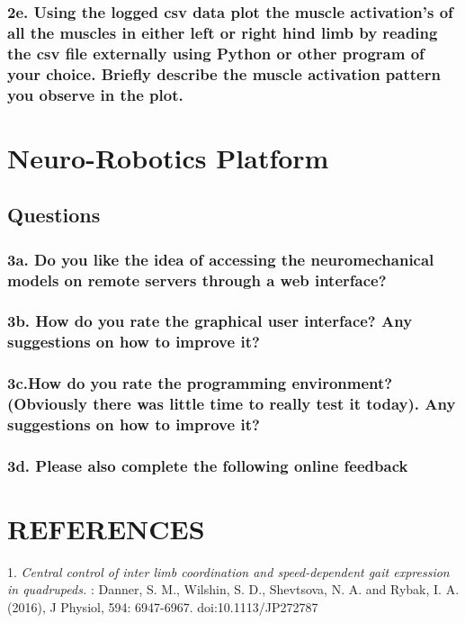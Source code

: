 \documentclass{cmc}
\begin{document}
{        \subsubsection*{2e. Using the logged csv data plot the muscle
          activation's of all the muscles in either left or right hind
          limb by reading the csv file externally using Python or
          other program of your choice. Briefly describe the muscle
          activation pattern you observe in the plot. }
      
        \section*{Neuro-Robotics Platform}
        \label{sec:nrp-feedb-quest}

        \subsection*{Questions}
        
        \subsubsection*{3a. Do you like the idea of accessing the
          neuromechanical models on remote servers through a web
          interface?}

        \subsubsection*{3b. How do you rate the graphical user
          interface? Any suggestions on how to improve it?}

        \subsubsection*{3c.How do you rate the programming
          environment?  (Obviously there was little time to really
          test it today). Any suggestions on how to improve it?}

        \subsubsection*{3d. Please also complete the following online
          feedback
          \href{https://docs.google.com/forms/d/e/1FAIpQLSfmcBCIoLaNXOuNBGXvWdIbC453-T6F-mEafyHQbhINUy8IMw/viewform}{
          }}

        \section*{REFERENCES}
        \label{sec:references}

        1. \textit{Central control of inter limb coordination and
          speed-dependent gait expression in quadrupeds.} : Danner,
        S. M., Wilshin, S. D., Shevtsova, N. A. and Rybak,
        I. A. (2016), J Physiol, 594: 6947-6967. doi:10.1113/JP272787
        \href{https://www.ncbi.nlm.nih.gov/pmc/articles/PMC5134391/pdf/TJP-594-6947.pdf}{\corr{[link]}}}
       
    
\end{document}
